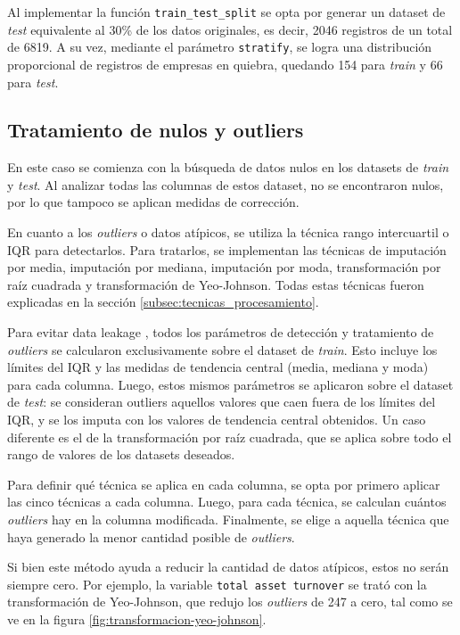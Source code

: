 Al implementar la función \texttt{train\_test\_split} se opta por generar un dataset de \textit{test} equivalente al 30\% de los datos originales, es decir, 2046 registros de un total de 6819. A su vez, mediante el parámetro \texttt{stratify}, se logra una distribución proporcional de registros de empresas en quiebra, quedando 154 para \textit{train} y 66 para \textit{test}.

\subsection{Tratamiento de nulos y outliers}

En este caso se comienza con la búsqueda de datos nulos en los datasets de \textit{train} y \textit{test}. Al analizar todas las columnas de estos dataset, no se encontraron nulos, por lo que tampoco se aplican medidas de corrección.

En cuanto a los \textit{outliers} o datos atípicos, se utiliza la técnica rango intercuartil o IQR para detectarlos. Para tratarlos, se implementan las técnicas de imputación por media, imputación por mediana, imputación por moda, transformación por raíz cuadrada y transformación de Yeo-Johnson. Todas estas técnicas fueron explicadas en la sección \ref{subsec:tecnicas_procesamiento}.

Para evitar data leakage \citep{data_leakage}, todos los parámetros de detección y tratamiento de \textit{outliers} se calcularon exclusivamente sobre el dataset de \textit{train}. Esto incluye los límites del IQR y las medidas de tendencia central (media, mediana y moda) para cada columna. Luego, estos mismos parámetros se aplicaron sobre el dataset de \textit{test}: se consideran outliers aquellos valores que caen fuera de los límites del IQR, y se los imputa con los valores de tendencia central obtenidos. Un caso diferente es el de la transformación por raíz cuadrada, que se aplica sobre todo el rango de valores de los datasets deseados.

Para definir qué técnica se aplica en cada columna, se opta por primero aplicar las cinco técnicas a cada columna. Luego, para cada técnica, se calculan cuántos \textit{outliers} hay en la columna modificada. Finalmente, se elige a aquella técnica que haya generado la menor cantidad posible de \textit{outliers}.

Si bien este método ayuda a reducir la cantidad de datos atípicos, estos no serán siempre cero. Por ejemplo, la variable \texttt{total asset turnover} se trató con la transformación de Yeo-Johnson, que redujo los \textit{outliers} de 247 a cero, tal como se ve en la figura \ref{fig:transformacion-yeo-johnson}.

